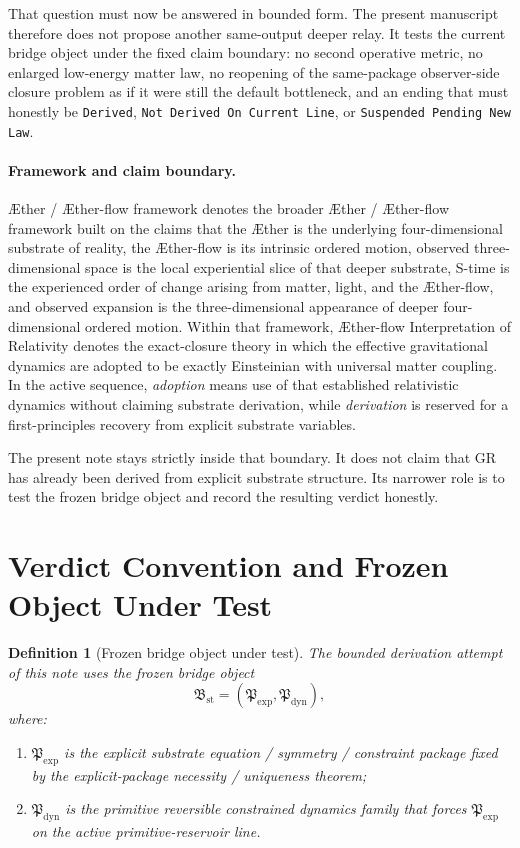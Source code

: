 \documentclass[11pt]{article}
\newcommand{\Aether}{\AE{}ther}
\newcommand{\Aflow}{\AE{}ther-flow}
\newcommand{\TheoryName}{\Aflow{} Interpretation of Relativity}
\newcommand{\TheoryProgram}{\Aether{} / \Aflow{} framework}
\newcommand{\ExplicitPackage}{\mathfrak P_{\mathrm{exp}}}
\newcommand{\PrimitiveFamily}{\mathfrak P_{\mathrm{dyn}}}
\newcommand{\StableBridgeObject}{\mathfrak B_{\mathrm{st}}}
\newtheorem{definition}{Definition}
\begin{document}
That question must now be answered in bounded form. The present manuscript therefore does not propose another same-output deeper relay. It tests the current bridge object under the fixed claim boundary: no second operative metric, no enlarged low-energy matter law, no reopening of the same-package observer-side closure problem as if it were still the default bottleneck, and an ending that must honestly be \texttt{Derived}, \texttt{Not Derived On Current Line}, or \texttt{Suspended Pending New Law}.

\paragraph{Framework and claim boundary.}
\TheoryProgram{} denotes the broader \Aether{} / \Aflow{} framework built on the claims that the \Aether{} is the underlying four-dimensional substrate of reality, the \Aflow{} is its intrinsic ordered motion, observed three-dimensional space is the local experiential slice of that deeper substrate, S-time is the experienced order of change arising from matter, light, and the \Aflow{}, and observed expansion is the three-dimensional appearance of deeper four-dimensional ordered motion. Within that framework, \TheoryName{} denotes the exact-closure theory in which the effective gravitational dynamics are adopted to be exactly Einsteinian with universal matter coupling. In the active sequence, \emph{adoption} means use of that established relativistic dynamics without claiming substrate derivation, while \emph{derivation} is reserved for a first-principles recovery from explicit substrate variables.

The present note stays strictly inside that boundary. It does not claim that GR has already been derived from explicit substrate structure. Its narrower role is to test the frozen bridge object and record the resulting verdict honestly.

\section{Verdict Convention and Frozen Object Under Test}

\begin{definition}[Frozen bridge object under test]
\label{def:bridge_object}
The bounded derivation attempt of this note uses the frozen bridge object
\[
\StableBridgeObject=(\ExplicitPackage,\PrimitiveFamily),
\]
where:
\begin{enumerate}
    \item \(\ExplicitPackage\) is the explicit substrate equation / symmetry / constraint package fixed by the explicit-package necessity / uniqueness theorem;
    \item \(\PrimitiveFamily\) is the primitive reversible constrained dynamics family that forces \(\ExplicitPackage\) on the active primitive-reservoir line.
\end{enumerate}
\end{definition}
\end{document}
